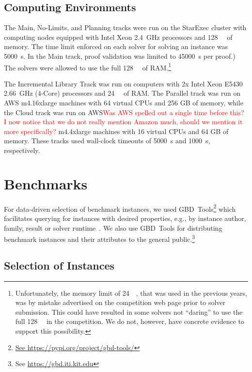 \documentclass{elsarticle}
\begin{document}
\subsection{Computing Environments}

\label{sec:computing}
The Main, No-Limits, and Planning tracks were run on the StarExec cluster \cite{starexec}
with computing nodes  equipped with Intel Xeon \SI{2.4}{\giga\hertz} processors 
and \SI{128}{\giga\byte} of memory.
The time limit enforced on each solver for solving an instance was \SI{5000}{\second}. 
In the Main track, proof validation was limited to \SI{45000}{\second} per proof.)
The solvers were allowed to use the full \SI{128}{\giga\byte} of RAM.\footnote{
Unfortunately, the memory limit of \SI{24}{\giga\byte}, that was used in the previous years,
was by mistake advertised on the competition web page prior to solver submission.
This could have resulted in some solvers not ``daring'' to use the full \SI{128}{\giga\byte}
in the competition. We do not, however, have concrete evidence to support this possibility.}

The Incremental Library Track was run on computers with 2x Intel Xeon E5430 \SI{2.66}{\giga\hertz}
(4-Core) processors and \SI{24}{\giga\byte} of RAM.
The Parallel track was run on AWS m4.16xlarge machines with 64 virtual CPUs and 256 GB
of memory, while the Cloud track was run on AWS\textcolor{red}{Was AWS spelled out a single time before this? I now notice that
we do not really mention Amazon much, should we mention it more specifically?}
 m4.4xlarge machines with 16 virtual CPUs and 64 GB of
memory. These tracks used wall-clock timeouts of \SI{5000}{\second} and \SI{1000}{\second}, respectively.

\section{Benchmarks}
\label{sec:instances}

For data-driven selection of benchmark instances, we used GBD~Tools\footnote{\url{See https://pypi.org/project/gbd-tools/}} which facilitates querying for instances with desired properties, e.g., by instance author, family, result or solver runtime~\cite{Iser:2018:GBD}. 
We also use GBD~Tools for distributing benchmark instances and their attributes to the general public.\footnote{See \url{https://gbd.iti.kit.edu}} 

\subsection{Selection of Instances}
\label{sec:byob}
\end{document}
